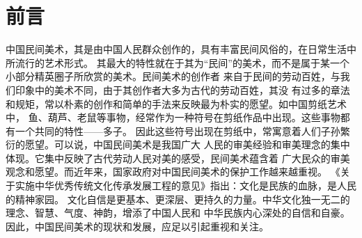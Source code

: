 \section{前言}
中国民间美术，其是由中国人民群众创作的，具有丰富民间风俗的，在日常生活中所流行的艺术形式。
其最大的特性就在于其为“民间”的美术，而不是属于某一个小部分精英圈子所欣赏的美术。民间美术的创作者
来自于民间的劳动百姓，与我们印象中的美术不同，由于其创作者大多为古代的劳动百姓，其没
有过多的章法和规矩，常以朴素的创作和简单的手法来反映最为朴实的愿望。如中国剪纸艺术中，
鱼、葫芦、老鼠等事物，经常作为一种符号在剪纸作品中出现。这些事物都有一个共同的特性——多子。
因此这些符号出现在剪纸中，常寓意着人们子孙繁衍的愿望。可以说，中国民间美术是我国广大
人民的审美经验和审美理念的集中体现。它集中反映了古代劳动人民对美的感受，民间美术蕴含着
广大民众的审美观念和愿望。而近年来，国家政府对中国民间美术的保护工作越来越重视。
《关于实施中华优秀传统文化传承发展工程的意见》指出：文化是民族的血脉，是人民的精神家园。
文化自信是更基本、更深层、更持久的力量。中华文化独一无二的理念、智慧、气度、神韵，增添了中国人民和
中华民族内心深处的自信和自豪。因此，中国民间美术的现状和发展，应足以引起重视和关注。
